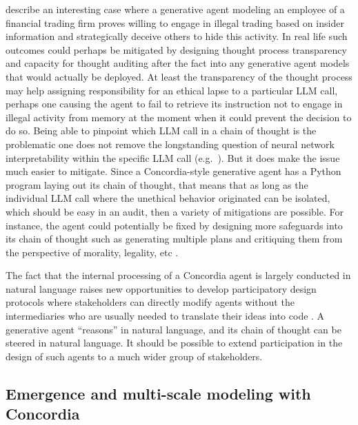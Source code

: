 \documentclass[11pt, a4paper, logo, twocolumn, internal, copyright, numbering]{googledeepmind}
\begin{document}
\cite{scheurer2023technical} describe an interesting case where a generative agent modeling an employee of a financial trading firm proves willing to engage in illegal trading based on insider information and strategically deceive others to hide this activity. In real life such outcomes could perhaps be mitigated by designing thought process transparency and capacity for thought auditing after the fact into any generative agent models that would actually be deployed. At least the transparency of the thought process may help assigning responsibility for an ethical lapse to a particular LLM call, perhaps one causing the agent to fail to retrieve its instruction not to engage in illegal activity from memory at the moment when it could prevent the decision to do so. Being able to pinpoint which LLM call in a chain of thought is the problematic one does not remove the longstanding question of neural network interpretability within the specific LLM call (e.g.~\cite{adadi2018peeking}). But it does make the issue much easier to mitigate. Since a Concordia-style generative agent has a Python program laying out its chain of thought, that means that as long as the individual LLM call where the unethical behavior originated can be isolated, which should be easy in an audit, then a variety of mitigations are possible. For instance, the agent could potentially be fixed by designing more safeguards into its chain of thought such as generating multiple plans and critiquing them from the perspective of morality, legality, etc \citep{arcas2022large, bai2022constitutional, weidinger2023sociotechnical}.

The fact that the internal processing of a Concordia agent is largely conducted in natural language raises new opportunities to develop participatory design protocols where stakeholders can directly modify agents without the intermediaries who are usually needed to translate their ideas into code \citep{birhane2022power}. A generative agent ``reasons'' in natural language, and its chain of thought can be steered in natural language. It should be possible to extend participation in the design of such agents to a much wider group of stakeholders.

\subsection{Emergence and multi-scale modeling with Concordia}
\end{document}

